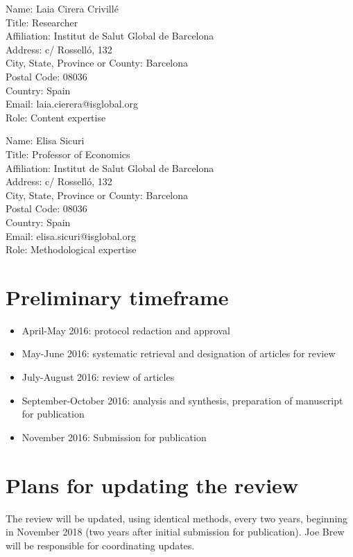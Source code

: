 \documentclass{article}
\begin{document}
Name: Laia Cirera Crivillé\\
Title: Researcher\\
Affiliation: Institut de Salut Global de Barcelona\\
Address: c/ Rosselló, 132\\
City, State, Province or County: Barcelona\\
Postal Code: 08036\\
Country: Spain\\
Email: laia.cierera@isglobal.org\\
Role: Content expertise


\vspace{5mm}

\noindent Name: Elisa Sicuri\\
Title: Professor of Economics\\
Affiliation: Institut de Salut Global de Barcelona\\
Address: c/ Rosselló, 132\\
City, State, Province or County: Barcelona\\
Postal Code: 08036\\
Country: Spain\\
Email: elisa.sicuri@isglobal.org\\
Role: Methodological expertise\\


\section*{Preliminary timeframe}

\begin{itemize}
  \setlength\itemsep{-0.2em}
\item April-May 2016: protocol redaction and approval
\item May-June 2016: systematic retrieval and designation of articles for review
\item July-August 2016: review of articles
\item September-October 2016: analysis and synthesis, preparation of manuscript for publication
\item November 2016: Submission for publication
\end{itemize}

\section*{Plans for updating the review} 

The review will be updated, using identical methods, every two years, beginning in November 2018 (two years after initial submission for publication). Joe Brew will be responsible for coordinating updates.


{}
  
\end{document}
